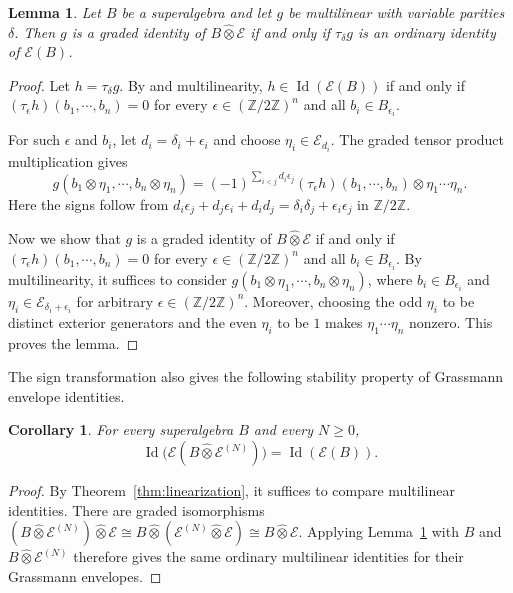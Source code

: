 \documentclass[11pt,reqno]{amsart}
\newcommand{\E}{\mathcal E}
\newcommand{\Id}{\operatorname{Id}}
\newcommand{\Ztwo}{\mathbb Z/2\mathbb Z}
\newtheorem{lemma}[theorem]{Lemma}
\newtheorem{corollary}[theorem]{Corollary}
\theoremstyle{definition}
\theoremstyle{remark}
\numberwithin{equation}{section}
\begin{document}
\begin{lemma}\label{lem:sign-transfer}
Let $B$ be a superalgebra and let $g$ be multilinear with variable parities $\delta$. Then $g$ is a graded identity of $B\mathbin{\widehat{\otimes}}\E$ if and only if $\tau_\delta g$ is an ordinary identity of $\E(B)$.
\end{lemma}

\begin{proof}
Let $h=\tau_\delta g$.
By \cite[Lemma~3.7.4]{GiambrunoZaicev2005} and multilinearity,
$h\in\Id(\E(B))$ if and only if
$
(\tau_\epsilon h)(b_1,\cdots,b_n)=0$
for every $\epsilon\in(\Ztwo)^n$ and all
$b_i\in B_{\epsilon_i}$.

For such $\epsilon$ and $b_i$, let
$d_i=\delta_i+\epsilon_i$ and choose $\eta_i\in\E_{d_i}$.
The graded tensor product multiplication gives
\[
g(b_1\otimes\eta_1,\cdots,b_n\otimes\eta_n)
=
(-1)^{\sum_{i<j}d_i\epsilon_j}
(\tau_\epsilon h)(b_1,\cdots,b_n)
\otimes\eta_1\cdots\eta_n.
\]
Here the signs follow from
$d_i\epsilon_j+d_j\epsilon_i+d_id_j
=\delta_i\delta_j+\epsilon_i\epsilon_j$ in $\Ztwo$.

Now we show that $g$ is a graded
identity of $B\mathbin{\widehat{\otimes}}\E$ if and only if
$(\tau_\epsilon h)(b_1,\cdots,b_n)=0$ for every
$\epsilon\in(\Ztwo)^n$ and all $b_i\in B_{\epsilon_i}$.
By multilinearity, it suffices to consider
$g(b_1\otimes\eta_1,\cdots,b_n\otimes\eta_n)$,
where $b_i\in B_{\epsilon_i}$ and
$\eta_i\in\E_{\delta_i+\epsilon_i}$ for arbitrary
$\epsilon\in(\Ztwo)^n$.
 Moreover, choosing the odd $\eta_i$
to be distinct exterior generators and the even $\eta_i$
to be $1$ makes $\eta_1\cdots\eta_n$ nonzero.
This proves the lemma.
\end{proof}




The sign transformation also gives the following stability property
of Grassmann envelope identities.

\begin{corollary}\label{cor:envelope-stability}
For every superalgebra $B$ and every $N\geq0$,
\[
\Id\bigl(\E(B\mathbin{\widehat{\otimes}}\E^{(N)})\bigr)=\Id(\E(B)).
\]
\end{corollary}
\begin{proof}
By Theorem~\ref{thm:linearization}, it suffices to compare
multilinear identities. There are graded isomorphisms $
(B\mathbin{\widehat{\otimes}}\E^{(N)})\mathbin{\widehat{\otimes}}\E
\cong B\mathbin{\widehat{\otimes}}(\E^{(N)}\mathbin{\widehat{\otimes}}\E)
\cong B\mathbin{\widehat{\otimes}}\E$.
Applying Lemma~\ref{lem:sign-transfer} with $B$ and
$B\mathbin{\widehat{\otimes}}\E^{(N)}$ therefore gives the same ordinary
multilinear identities for their Grassmann envelopes.
\end{proof}
\end{document}
